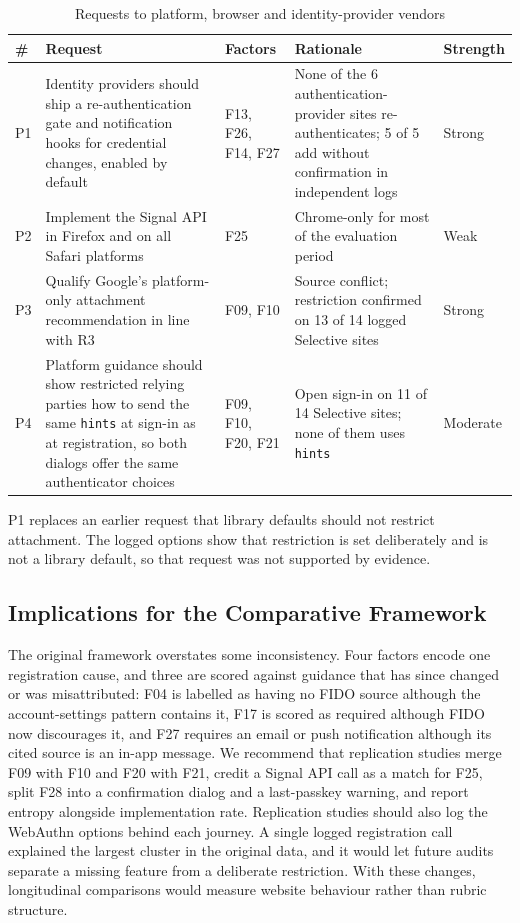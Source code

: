 \documentclass[letterpaper,twocolumn,10pt]{article}
\begin{document}
\begin{table}[t]\centering\footnotesize\setlength{\tabcolsep}{3pt}\caption{Requests to platform, browser and identity-provider vendors}\label{tab:10}
\begin{tabularx}{\textwidth}{l>{\raggedright\arraybackslash}X>{\raggedright\arraybackslash}p{2.2cm}>{\raggedright\arraybackslash}p{3.8cm}>{\raggedright\arraybackslash}p{1.3cm}}\toprule
\textbf{\#} & \textbf{Request} & \textbf{Factors} & \textbf{Rationale} & \textbf{Strength} \\ \midrule
P1 & Identity providers should ship a re-authentication gate and notification hooks for credential changes, enabled by default & F13, F26, F14, F27 & None of the 6 authentication-provider sites re-authenticates; 5 of 5 add without confirmation in independent logs & Strong \\
P2 & Implement the Signal API in Firefox and on all Safari platforms & F25 & Chrome-only for most of the evaluation period & Weak \\
P3 & Qualify Google's platform-only attachment recommendation in line with R3 & F09, F10 & Source conflict; restriction confirmed on 13 of 14 logged Selective sites & Strong \\
P4 & Platform guidance should show restricted relying parties how to send the same \texttt{hints} at sign-in as at registration, so both dialogs offer the same authenticator choices & F09, F10, F20, F21 & Open sign-in on 11 of 14 Selective sites; none of them uses \texttt{hints} & Moderate \\
\bottomrule\end{tabularx}\end{table}

P1 replaces an earlier request that library defaults should not restrict attachment. The logged options show that restriction is set deliberately and is not a library default, so that request was not supported by evidence.

\subsection{Implications for the Comparative Framework}

The original framework overstates some inconsistency. Four factors encode one registration cause, and three are scored against guidance that has since changed or was misattributed: F04 is labelled as having no FIDO source although the account-settings pattern contains it, F17 is scored as required although FIDO now discourages it, and F27 requires an email or push notification although its cited source is an in-app message. We recommend that replication studies merge F09 with F10 and F20 with F21, credit a Signal API call as a match for F25, split F28 into a confirmation dialog and a last-passkey warning, and report entropy alongside implementation rate. Replication studies should also log the WebAuthn options behind each journey. A single logged registration call explained the largest cluster in the original data, and it would let future audits separate a missing feature from a deliberate restriction. With these changes, longitudinal comparisons would measure website behaviour rather than rubric structure.
\end{document}

